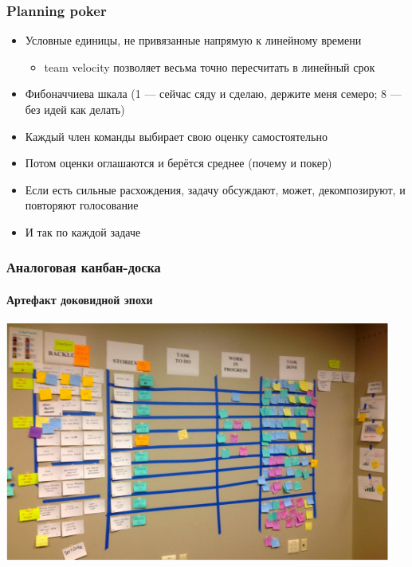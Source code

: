 \documentclass{../../slides-style}
\begin{document}
    \begin{frame}
        \frametitle{Planning poker}
        \begin{itemize}
            \item Условные единицы, не привязанные напрямую к линейному времени
            \begin{itemize}
                \item team velocity позволяет весьма точно пересчитать в линейный срок
            \end{itemize}
            \item Фибоначчиева шкала (1 --- сейчас сяду и сделаю, держите меня семеро; 8 --- без идей как делать)
            \item Каждый член команды выбирает свою оценку самостоятельно
            \item Потом оценки оглашаются и берётся среднее (почему и покер)
            \item Если есть сильные расхождения, задачу обсуждают, может, декомпозируют, и повторяют голосование
            \item И так по каждой задаче
        \end{itemize}
    \end{frame}

    \begin{frame}
        \frametitle{Аналоговая канбан-доска}
        \framesubtitle{Артефакт доковидной эпохи}
        \begin{center}
            \includegraphics[width=0.95\textwidth]{kanban.png}
        \end{center}
    \end{frame}
\end{document}
